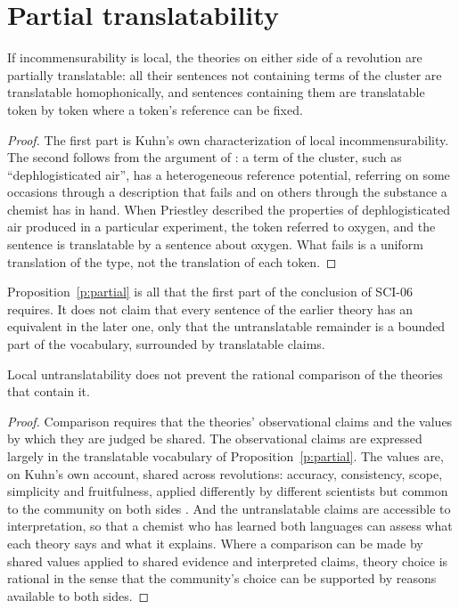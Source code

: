 \documentclass{situationist-preprint}
\begin{document}
\section{Partial translatability}\label{s:partial}

\begin{proposition}\label{p:partial}
If incommensurability is local, the theories on either side of a revolution are partially translatable: all their sentences not containing terms of the cluster are translatable homophonically, and sentences containing them are translatable token by token where a token's reference can be fixed.
\end{proposition}

\begin{proof}
The first part is Kuhn's own characterization of local incommensurability. The second follows from the argument of \citet{Kitcher1978}: a term of the cluster, such as \enquote{dephlogisticated air}, has a heterogeneous reference potential, referring on some occasions through a description that fails and on others through the substance a chemist has in hand. When Priestley described the properties of dephlogisticated air produced in a particular experiment, the token referred to oxygen, and the sentence is translatable by a sentence about oxygen. What fails is a uniform translation of the type, not the translation of each token.
\end{proof}

Proposition~\ref{p:partial} is all that the first part of the conclusion of SCI-06 requires. It does not claim that every sentence of the earlier theory has an equivalent in the later one, only that the untranslatable remainder is a bounded part of the vocabulary, surrounded by translatable claims.

\begin{proposition}\label{p:choice}
Local untranslatability does not prevent the rational comparison of the theories that contain it.
\end{proposition}

\begin{proof}
Comparison requires that the theories' observational claims and the values by which they are judged be shared. The observational claims are expressed largely in the translatable vocabulary of Proposition~\ref{p:partial}. The values are, on Kuhn's own account, shared across revolutions: accuracy, consistency, scope, simplicity and fruitfulness, applied differently by different scientists but common to the community on both sides \citep{Kuhn1977}. And the untranslatable claims are accessible to interpretation, so that a chemist who has learned both languages can assess what each theory says and what it explains. Where a comparison can be made by shared values applied to shared evidence and interpreted claims, theory choice is rational in the sense that the community's choice can be supported by reasons available to both sides.
\end{proof}
\end{document}
